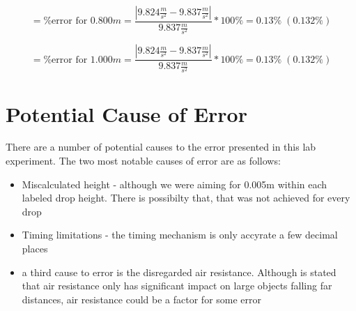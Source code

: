\begin{equation*}
  = \text{\%error for 0.800$m$} = \frac{|9.824\frac{m}{s^2} - 9.837\frac{m}{s^2}|}{9.837\frac{m}{s^2}} * 100\% = 0.13\% \; (0.132\%)
\end{equation*}

\begin{equation*}
  = \text{\%error for 1.000$m$} = \frac{|9.824\frac{m}{s^2} - 9.837\frac{m}{s^2}|}{9.837\frac{m}{s^2}} * 100\% = 0.13\% \; (0.132\%)
\end{equation*}

\section{Potential Cause of Error}
There are a number of potential causes to the error presented in this lab 
experiment. The two most notable causes of error are as follows:
\begin{itemize}
  \item Miscalculated height - although we were aiming for 0.005m within each labeled
    drop height. There is possibilty that, that was not achieved for every drop
  \item Timing limitations - the timing mechanism is only accyrate a few decimal places
  \item a third cause to error is the disregarded air resistance. Although is stated 
    that air resistance only has significant impact on large objects falling far distances,
    air resistance could be a factor for some error
\end{itemize}
    

